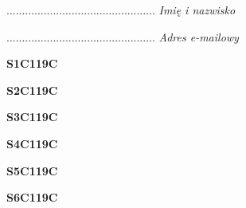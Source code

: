 \begin{turn}{90}\begin{minipage}{\linewidth} \vspace{20mm} ................................................  \textit{Imię i nazwisko}\end{minipage}\end{turn}

\begin{turn}{90}\begin{minipage}{\linewidth} \vspace{20mm} ................................................  \textit{Adres e-mailowy}\end{minipage}\end{turn}

\begin{turn}{90}\huge \begin{minipage}{\linewidth} \vspace{10mm}\textbf{S1C119C}\end{minipage}\end{turn}

\begin{turn}{90}\huge \begin{minipage}{\linewidth} \vspace{10mm}\textbf{S2C119C}\end{minipage}\end{turn}

\begin{turn}{90}\huge \begin{minipage}{\linewidth} \vspace{10mm}\textbf{S3C119C}\end{minipage}\end{turn}

\begin{turn}{90}\huge \begin{minipage}{\linewidth} \vspace{10mm}\textbf{S4C119C}\end{minipage}\end{turn}

\begin{turn}{90}\huge \begin{minipage}{\linewidth} \vspace{10mm}\textbf{S5C119C}\end{minipage}\end{turn}

\begin{turn}{90}\huge \begin{minipage}{\linewidth} \vspace{10mm}\textbf{S6C119C}\end{minipage}\end{turn}


